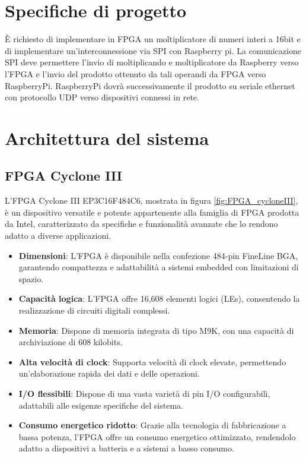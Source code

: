\documentclass[titlepage]{report}
\begin{document}
  
\setlength{\parskip}{\baselineskip} 


\begin{frontespizio}
\end{frontespizio}
\tableofcontents
\newpage


\chapter*{Specifiche di progetto}
\label{ch:specs}
	È richiesto di implementare in FPGA un moltiplicatore di numeri interi a 16bit e di
	implementare un'interconnessione via SPI con Raspberry pi. La comunicazione SPI deve
	permettere l'invio di moltiplicando e moltiplicatore da Raspberry verso l'FPGA e l'invio del
	prodotto ottenuto da tali operandi da FPGA verso RaspberryPi. 
	RaspberryPi dovrà successivamente il prodotto su seriale ethernet con protocollo UDP verso dispositivi connessi in rete.

\chapter*{Architettura del sistema}
\label{ch:architettura}

	\section*{FPGA Cyclone III}
	\label{sec:fpga}
		L'FPGA Cyclone III EP3C16F484C6, mostrata in figura \ref{fig:FPGA_cycloneIII}, è un dispositivo versatile e potente appartenente alla famiglia di FPGA prodotta da Intel, caratterizzato da specifiche e funzionalità avanzate che lo rendono adatto a diverse applicazioni.

		\begin{itemize}
			\item \textbf{Dimensioni}: L'FPGA è disponibile nella confezione 484-pin FineLine BGA, garantendo compattezza e adattabilità a sistemi embedded con limitazioni di spazio.
			\item \textbf{Capacità logica}: L'FPGA offre 16,608 elementi logici (LEs), consentendo la realizzazione di circuiti digitali complessi.
			\item \textbf{Memoria}: Dispone di memoria integrata di tipo M9K, con una capacità di archiviazione di 608 kilobits.
			\item \textbf{Alta velocità di clock}: Supporta velocità di clock elevate, permettendo un'elaborazione rapida dei dati e delle operazioni.
			\item \textbf{I/O flessibili}: Dispone di una vasta varietà di pin I/O configurabili, adattabili alle esigenze specifiche del sistema.
			\item \textbf{Consumo energetico ridotto}: Grazie alla tecnologia di fabbricazione a bassa potenza, l'FPGA offre un consumo energetico ottimizzato, rendendolo adatto a dispositivi a batteria e a sistemi a basso consumo.
		\end{itemize}
		
\end{document}
